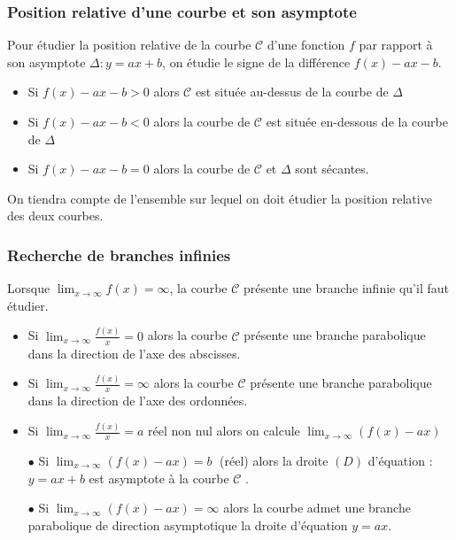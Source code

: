\subsubsection*{Position relative d'une courbe et son asymptote}
Pour étudier la position relative de la  courbe $\mathcal{C} $ d'une fonction $ f $ par rapport à son asymptote $ \Delta : y=ax+b $, on étudie le signe de la différence $ f(x)-ax-b$.
\begin{itemize}
\item  Si $ f(x)-ax-b > 0$ alors  $ \mathcal{C}  $ est  située  au-dessus de la courbe de $ \Delta $ 
\item  Si $ f(x)-ax-b< 0$ alors la courbe de $\mathcal{C}$ est  située  en-dessous de la courbe de $\Delta$ 
\item  Si $ f(x)-ax-b= 0$ alors la courbe de $\mathcal{C}$ et  $\Delta$  sont sécantes.
\end{itemize}
On tiendra compte de l'ensemble sur lequel on doit étudier la position relative des deux courbes.
\subsubsection{Recherche de branches infinies}
Lorsque  $\displaystyle \lim_{x \to \infty}f(x)=\infty  $, la courbe $ \mathcal{C} $ présente une branche infinie qu'il faut étudier.
\begin{itemize}
\item    Si $\displaystyle \lim_{x \to \infty}\frac{f(x)}{x}=0  $  alors la courbe $ \mathcal{C} $ présente une branche parabolique dans la direction  de  l'axe des abscisses.

\item    Si $\displaystyle \lim_{x \to \infty}\frac{f(x)}{x}=\infty$  alors la courbe $ \mathcal{C} $ présente une branche parabolique dans la direction  de  l'axe des ordonnées.
\item  Si  $\displaystyle\lim_{x \to \infty}\frac{f(x)}{x}=a  $  réel  non nul alors on calcule $\lim_{x \to \infty}(f(x)-ax )  $ 

 $ \bullet $ Si  $\displaystyle \lim_{x \to \infty}(f(x)-ax) = b \; $  (réel) alors la droite $(D)$ d'équation : $y = a x  + b $ est asymptote à la courbe $ \mathcal{C} $ .

 $ \bullet $ Si $\displaystyle \lim_{x \to \infty}(f(x)-ax) = \infty $     alors la courbe admet une branche parabolique de direction asymptotique la droite d'équation $ y =  a x $.
\end{itemize}


